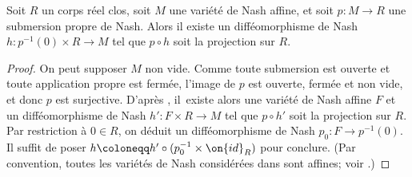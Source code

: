 \begin{thm}\label{coste-shiota-thom}
Soit $R$ un corps réel clos, soit $M$ une variété de Nash affine, et soit $p\colon M\to R$ une submersion propre de Nash. Alors il existe un difféomorphisme de Nash $h\colon p^{-1}(0)\times R\to M$ tel que $p\circ h$ soit la projection sur $R$.
\end{thm}

\begin{proof}
On peut supposer $M$ non vide. Comme toute submersion est ouverte et toute application propre est fermée, l'image de $p$ est ouverte, fermée et non vide, et donc $p$ est surjective. D'après \cite[Th.\,A, Th.\,2.4(iii')]{coste1992nash}, il~existe alors une variété de Nash affine $F$ et un difféomorphisme de Nash $h'\colon F\times R\to M$ tel que $p\circ h'$ soit la projection sur $R$. Par restriction à $0\in R$, on déduit un difféomorphisme de Nash $p_0\colon F\to p^{-1}(0)$. Il suffit de poser $h\coloneqq h'\circ (p_0^{-1}\times \on{id}_R)$ pour conclure. (Par convention, toutes les variétés de Nash considérées dans \cite{coste1992nash} sont affines; voir \cite[p.\,351]{coste1992nash}.)
\end{proof}

